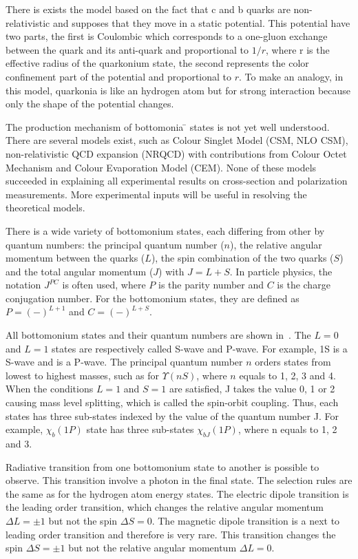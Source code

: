 There is exists the model based on the fact that c and b quarks are
non-relativistic and supposes that they move in a static
potential\cite{Kulshreshtha:1984mw,Parmar:2010ii,shah}. This potential have two
parts, the first is Coulombic which corresponds to a one-gluon exchange between
the quark and its anti-quark and proportional to $1/r$, where r is the
effective radius of the quarkonium state, the second represents the color
confinement part of the potential and proportional to $r$. To make an analogy,
in this model, quarkonia is like an hydrogen atom but for strong interaction
because only the shape of the potential changes.

The production mechanism of bottomonia ̄ states is not yet well understood.
There are several models exist, such as Colour Singlet Model (CSM, NLO CSM),
non-relativistic QCD expansion (NRQCD) with contributions from Colour Octet
Mechanism and Colour Evaporation Model (CEM). None of these models succeeded in
explaining all experimental results on cross-section and polarization measurements.
More experimental inputs will be useful in resolving the theoretical models.

There is a wide variety of bottomonium states, each differing from other by quantum
numbers: the principal quantum number ($n$), the relative angular momentum
between the quarks ($L$), the spin combination of the two quarks ($S$) and the total
angular momentum ($J$) with $J = L + S$. In particle physics, the notation $J^{PC}$ is
often used, where $P$ is the parity number and $C$ is the charge conjugation number.
For the bottomonium states, they are defined as $P=(-)^{L+1}$ and $C=(-)^{L+S}$.




All bottomonium states and their quantum numbers are shown
in~. The $L = 0$ and $L = 1$ states are respectively
called S-wave and P-wave. For example, \Y1S is a S-wave and \chiboneOneP is a
P-wave. The principal quantum number $n$ orders states from lowest to highest
masses, such as for $\Upsilon(nS)$, where $n$ equals to 1, 2, 3 and 4. When the
conditions $L = 1$ and $S = 1$ are satisfied, J takes the value 0, 1 or 2
causing mass level splitting, which is called the spin-orbit coupling. Thus,
each \chib states has three sub-states indexed by the value of the quantum
number J. For example, $\chi_b(1P)$ state has three sub-states $\chi_{bJ}(1P)$,
where n equals to 1, 2 and 3.

Radiative transition from one bottomonium state to another is possible to
observe. This transition involve a photon in the final state. The selection
rules are the same as for the hydrogen atom energy states. The electric dipole
transition is the leading order transition, which changes the relative angular
momentum $\Delta L  = \pm 1$ but not the spin $\Delta S = 0$. The magnetic
dipole transition is a next to leading order transition and therefore is very
rare. This transition changes the spin $\Delta S = \pm 1$ but not the relative
angular momentum $\Delta L = 0$.

